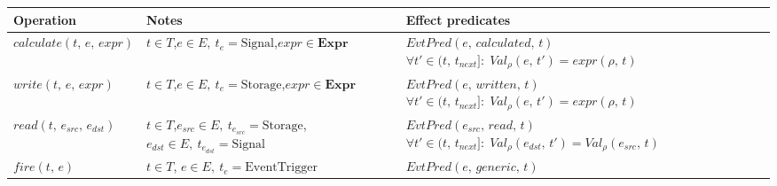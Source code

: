 \medskip
\renewcommand{\arraystretch}{2}
\begin{tabularx}{\textwidth}{lXX}
    \toprule
    \textbf{Operation} & \textbf{Notes}                                                                                                                                                                                        & \textbf{Effect predicates} \\
    \midrule
    $\mathit{calculate}(t,\, e,\, \mathit{expr})$
                       & $t \in T$,\newline $e \in E,\ t_e = \text{Signal}$,\newline $\mathit{expr} \in \mathbf{Expr}$
                       & $\mathit{EvtPred}(e,\, \mathit{calculated},\, t)$ \newline $\forall t' \in (t,\, t_{\mathit{next}}]:\; \mathit{Val}_\rho(e,\, t') = \mathit{expr}(\rho,\, t)$                                                                      \\[4pt]
    $\mathit{write}(t,\, e,\, \mathit{expr})$
                       & $t \in T$,\newline $e \in E,\ t_e = \text{Storage}$,\newline $\mathit{expr} \in \mathbf{Expr}$
                       & $\mathit{EvtPred}(e,\, \mathit{written},\, t)$ \newline $\forall t' \in (t,\, t_{\mathit{next}}]:\; \mathit{Val}_\rho(e,\, t') = \mathit{expr}(\rho,\, t)$                                                                         \\[4pt]
    $\mathit{read}(t,\, e_{\mathit{src}},\, e_{\mathit{dst}})$
                       & $t \in T$,\newline $e_{\mathit{src}} \in E,\ t_{e_{\mathit{src}}} = \text{Storage}$,\newline $e_{\mathit{dst}} \in E,\ t_{e_{\mathit{dst}}} = \text{Signal}$
                       & $\mathit{EvtPred}(e_{\mathit{src}},\, \mathit{read},\, t)$ \newline $\forall t' \in (t,\, t_{\mathit{next}}]:\; \mathit{Val}_\rho(e_{\mathit{dst}},\, t') = \mathit{Val}_\rho(e_{\mathit{src}},\, t)$                              \\[4pt]
    $\mathit{fire}(t,\, e)$
                       & $t \in T$, $e \in E,\ t_e = \text{EventTrigger}$
                       & $\mathit{EvtPred}(e,\, \mathit{generic},\, t)$                                                                                                                                                                                     \\[4pt]

\end{tabularx}
